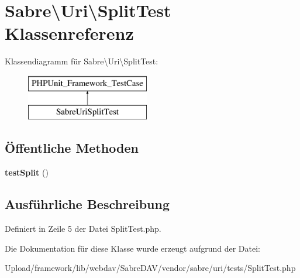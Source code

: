 \hypertarget{class_sabre_1_1_uri_1_1_split_test}{}\section{Sabre\textbackslash{}Uri\textbackslash{}Split\+Test Klassenreferenz}
\label{class_sabre_1_1_uri_1_1_split_test}
Klassendiagramm für Sabre\textbackslash{}Uri\textbackslash{}Split\+Test\+:\begin{figure}[H]
\begin{center}
\leavevmode
\includegraphics[height=2.000000cm]{class_sabre_1_1_uri_1_1_split_test}
\end{center}
\end{figure}
\subsection*{Öffentliche Methoden}
\begin{DoxyCompactItemize}
\item 
\mbox{\label{class_sabre_1_1_uri_1_1_split_test_a77a1974c6e87ca50e677c4063d456dfd}} 
{\bfseries test\+Split} ()
\end{DoxyCompactItemize}


\subsection{Ausführliche Beschreibung}


Definiert in Zeile 5 der Datei Split\+Test.\+php.



Die Dokumentation für diese Klasse wurde erzeugt aufgrund der Datei\+:\begin{DoxyCompactItemize}
\item 
Upload/framework/lib/webdav/\+Sabre\+D\+A\+V/vendor/sabre/uri/tests/Split\+Test.\+php\end{DoxyCompactItemize}
